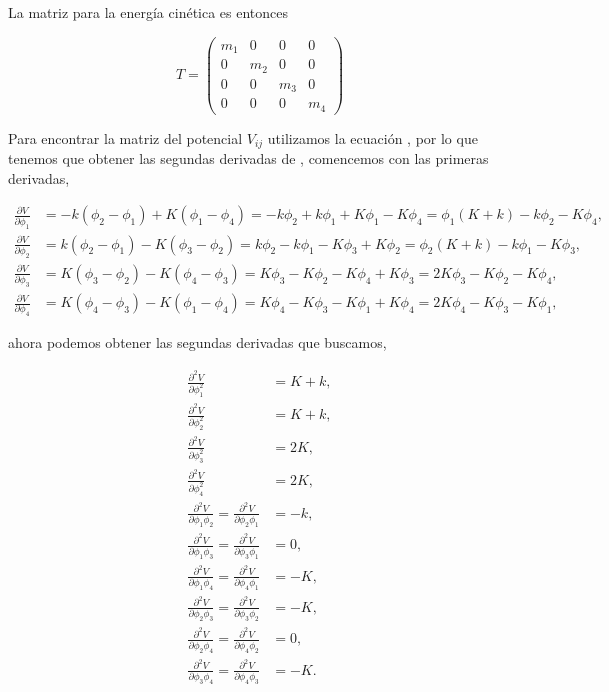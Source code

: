 \documentclass[a4paper,10pt]{article}
\numberwithin{equation}{section}
\begin{document}
La matriz para la energía cinética es entonces

\begin{equation}
 T = \begin{pmatrix}
      m_1 & 0 & 0 & 0 \\
      0 & m_2 & 0 & 0 \\
      0 & 0 & m_3 & 0 \\
      0 & 0 & 0 & m_4
     \end{pmatrix}
\end{equation}

Para encontrar la matriz del potencial $V_{ij}$ utilizamos la ecuación ,
por lo que tenemos que obtener las segundas derivadas de , comencemos 
con las primeras derivadas,

\begin{align*}
 \frac{\partial V}{\partial \phi_1} &= -k(\phi_2 - \phi_1) + K(\phi_1 - \phi_4) 
 = -k\phi_2 + k\phi_1 + K\phi_1 - K\phi_4 = \phi_1(K + k) -k\phi_2 - K\phi_4, \\
 \frac{\partial V}{\partial \phi_2} &= k(\phi_2 - \phi_1)  - K(\phi_3 - \phi_2)
 = k\phi_2 - k\phi_1 - K\phi_3 + K\phi_2 = \phi_2(K+k) - k\phi_1 - K\phi_3, \\
 \frac{\partial V}{\partial \phi_3} &= K(\phi_3 - \phi_2) - K(\phi_4 - \phi_3)
 = K\phi_3 - K\phi_2 - K\phi_4 + K\phi_3 = 2K\phi_3 - K\phi_2 - K\phi_4, \\
 \frac{\partial V}{\partial \phi_4} &=  K(\phi_4 - \phi_3) - K(\phi_1 - \phi_4)
 = K\phi_4 - K\phi_3 - K\phi_1 + K\phi_4 = 2K\phi_4 - K\phi_3 - K\phi_1 ,
\end{align*}

ahora podemos obtener las segundas derivadas que buscamos,

\begin{align*}
 \frac{\partial^2 V}{\partial \phi_1^2} &= K+k, \\
 \frac{\partial^2 V}{\partial \phi_2^2} &= K+k, \\
 \frac{\partial^2 V}{\partial \phi_3^2} &= 2K, \\
 \frac{\partial^2 V}{\partial \phi_4^2} &= 2K, \\
 \frac{\partial^2 V}{\partial \phi_1\phi_2} = \frac{\partial^2 V}{\partial \phi_2\phi_1}&= -k, \\
 \frac{\partial^2 V}{\partial \phi_1\phi_3} = \frac{\partial^2 V}{\partial \phi_3\phi_1}  &= 0, \\
 \frac{\partial^2 V}{\partial \phi_1\phi_4} =  \frac{\partial^2 V}{\partial \phi_4\phi_1} &= -K, \\
 \frac{\partial^2 V}{\partial \phi_2\phi_3} =  \frac{\partial^2 V}{\partial \phi_3\phi_2} &= -K, \\
 \frac{\partial^2 V}{\partial \phi_2\phi_4} =  \frac{\partial^2 V}{\partial \phi_4\phi_2} &= 0, \\ 
 \frac{\partial^2 V}{\partial \phi_3\phi_4} =  \frac{\partial^2 V}{\partial \phi_4\phi_3} &= -K.
\end{align*}
\end{document}
